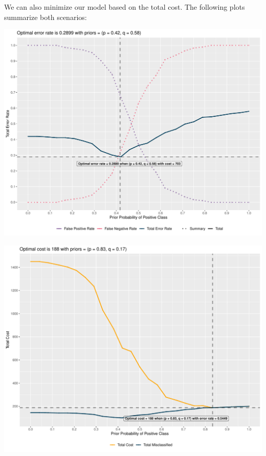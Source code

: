 \documentclass[
  11pt,
  a4paper,
]{scrartcl}
\begin{document}
We can also minimize our model based on the total cost. The following
plots summarize both scenarios:

\begin{center}\includegraphics{figure/analysis-lda-optimal-plot-1} \end{center}

\begin{center}\includegraphics{figure/analysis-lda-optimal-plot-2} \end{center}
\end{document}
